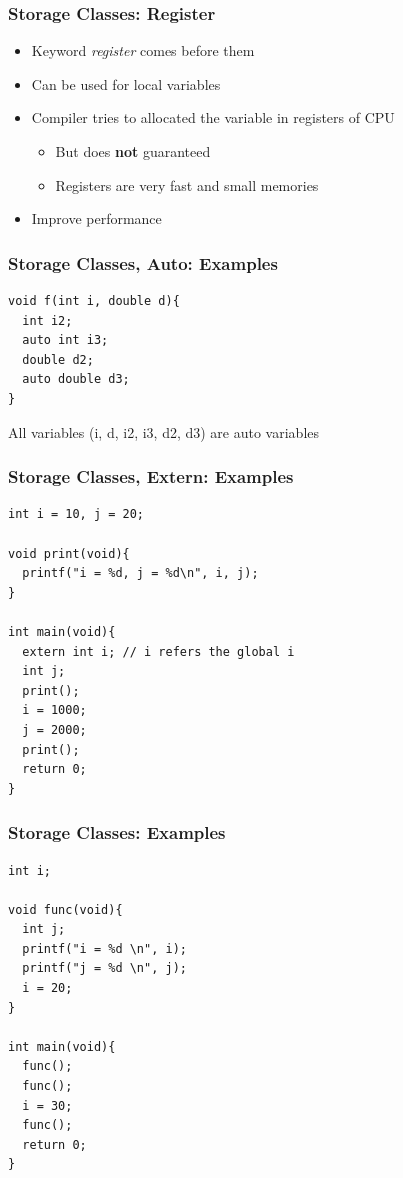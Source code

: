 \documentclass{../c-lecture}
\begin{document}
\begin{frame}
  \frametitle{Storage Classes: Register}
  \begin{itemize}
    \item Keyword \textit{\color{Orange} register} comes before them
    \item Can be used for local variables
    \item Compiler tries to allocated the variable in registers of CPU
    \begin{itemize}
      \item But does \textbf{\color{RubineRed} not} guaranteed
      \item Registers are very fast and small memories
    \end{itemize}
    \item Improve performance
  \end{itemize}
\end{frame}

\begin{frame}[fragile]
  \frametitle{Storage Classes, Auto: Examples}
  \scriptsize
  \begin{verbatim}
void f(int i, double d){
  int i2;
  auto int i3;
  double d2;
  auto double d3;
}
  \end{verbatim}
  \begin{block}{}
    All variables (i, d, i2, i3, d2, d3) are auto variables
  \end{block}
\end{frame}

\begin{frame}[fragile]
  \frametitle{Storage Classes, Extern: Examples}
  \scriptsize
  \begin{verbatim}
int i = 10, j = 20;

void print(void){
  printf("i = %d, j = %d\n", i, j);
}

int main(void){
  extern int i; // i refers the global i
  int j;
  print();
  i = 1000;
  j = 2000;
  print();
  return 0;
}
  \end{verbatim}
\end{frame}

\begin{frame}[fragile]
  \frametitle{Storage Classes: Examples}
  \scriptsize
  \begin{verbatim}
int i;

void func(void){
  int j;
  printf("i = %d \n", i);
  printf("j = %d \n", j);
  i = 20;
}

int main(void){
  func();
  func();
  i = 30;
  func();
  return 0;
}
  \end{verbatim}
\end{frame}
\end{document}
